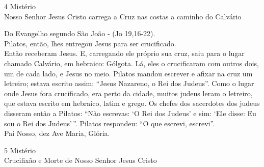 \begin{center}
    4\textordmasculine{} Mistério \\ Nosso Senhor Jesus Cristo carrega a Cruz nas costas a caminho do Calvário
\end{center}
\begin{flushleft}
    Do Evangelho segundo São João - (\textcolor{VioletRed2}{Jo 19,16-22}). \\
    \hfill{} \break{}
    Pilatos, então, lhes entregou Jesus para ser crucificado.
    \vspace{.2cm} \\
    Então receberam Jesus. E, carregando ele próprio sua cruz, saiu para o lugar chamado Calvário, em hebraico: Gólgota. Lá, eles o crucificaram com outros dois, um de cada lado, e Jesus no meio. Pilatos mandou escrever e afixar na cruz um letreiro; estava escrito assim: ``Jesus Nazareno, o Rei dos Judeus''. Como o lugar onde Jesus fora crucificado, era perto da cidade, muitos judeus leram o letreiro, que estava escrito em hebraico, latim e grego. Os chefes dos sacerdotes dos judeus disseram então a Pilatos: ``Não escrevas: `O Rei dos Judeus' e sim: `Ele disse: Eu sou o Rei dos Judeus'\,''. Pilatos respondeu: ``O que escrevi, escrevi''. \\
    \hfill{} \break{}
    Pai Nosso, dez Ave Maria, Glória.
\end{flushleft}
\newpage
\begin{center}
    5\textordmasculine{} Mistério \\ Crucifixão e Morte de Nosso Senhor Jesus Cristo
\end{center}
